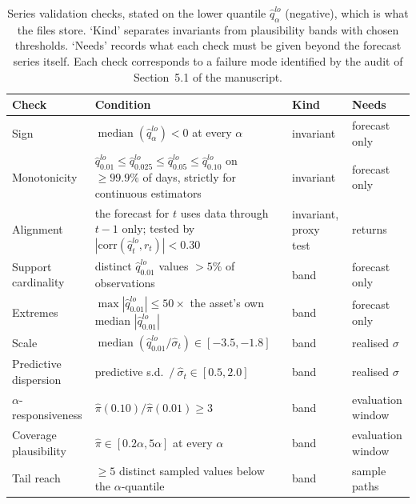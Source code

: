 \documentclass[preprint,11pt,authoryear]{elsarticle}
\newcommand{\1}{\boldsymbol{1}}
\begin{document}
\begin{table}[H]
	\centering
	\caption{Series validation checks, stated on the lower quantile
		$\hat q^{lo}_\alpha$ (negative), which is what the files store. `Kind'
		separates invariants from plausibility bands with chosen thresholds.
		`Needs' records what each check must be given beyond the forecast
		series itself. Each check corresponds to a failure mode identified by
		the audit of Section~5.1 of the manuscript.}
	\label{tab:validation_gate}
	\footnotesize
	\begin{tabular}{p{2.5cm}p{5.5cm}p{1.9cm}p{2.6cm}}
		\hline\hline
		\textbf{Check} & \textbf{Condition} & \textbf{Kind} & \textbf{Needs} \\
		\hline
		Sign & $\operatorname{median}(\hat q^{lo}_\alpha) < 0$ at every $\alpha$
		& invariant & forecast only \\
		Monotonicity & $\hat q^{lo}_{0.01} \leq \hat q^{lo}_{0.025} \leq
		\hat q^{lo}_{0.05} \leq \hat q^{lo}_{0.10}$ on $\geq 99.9\%$ of days,
		strictly for continuous estimators & invariant & forecast only \\
		Alignment & the forecast for $t$ uses data through $t-1$ only; tested by
		$|\mathrm{corr}(\hat q^{lo}_t, r_t)| < 0.30$ & invariant, proxy test
		& returns \\
		Support cardinality & distinct $\hat q^{lo}_{0.01}$ values $> 5\%$ of
		observations & band & forecast only \\
		Extremes & $\max |\hat q^{lo}_{0.01}| \leq 50 \times$ the asset's own
		median $|\hat q^{lo}_{0.01}|$ & band & forecast only \\
		Scale & $\operatorname{median}(\hat q^{lo}_{0.01}/\hat\sigma_t) \in
		[-3.5, -1.8]$ & band & realised $\sigma$ \\
		Predictive dispersion & predictive s.d.\ $/\ \hat\sigma_t \in [0.5, 2.0]$
		& band & realised $\sigma$ \\
		$\alpha$-responsiveness & $\hat\pi(0.10)/\hat\pi(0.01) \geq 3$ & band
		& evaluation window \\
		Coverage plausibility & $\hat\pi \in [0.2\alpha, 5\alpha]$ at every
		$\alpha$ & band & evaluation window \\
		Tail reach & $\geq 5$ distinct sampled values below the
		$\alpha$-quantile & band & sample paths \\
		\hline\hline
	\end{tabular}
\end{table}
\end{document}

